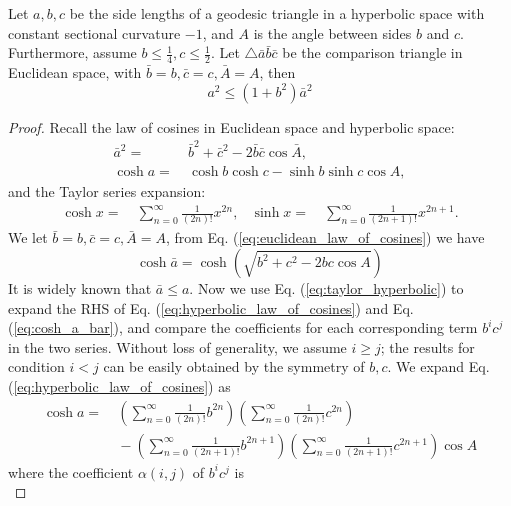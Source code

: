 \begin{lemma} \label{thm:small-c-hyperbolic}
	Let $a,b,c$ be the side lengths of a geodesic triangle in a hyperbolic space with constant sectional curvature $-1$, and $A$ is the angle between sides $b$ and $c$. Furthermore, assume $b\le\frac{1}{4},c\le\frac{1}{2}$. Let $\triangle\bar{a}\bar{b}\bar{c}$ be the comparison triangle in Euclidean space, with $\bar{b}=b,\bar{c}=c,\bar{A}=A$, then
	\begin{equation}
	a^2\le (1+b^2)\bar{a}^2
	\end{equation}
\end{lemma}
\begin{proof}
	Recall the law of cosines in Euclidean space and hyperbolic space:
	\begin{align}
	\label{eq:euclidean_law_of_cosines} \bar{a}^2 = &~ \bar{b}^2 + \bar{c}^2 - 2\bar{b}\bar{c}\cos\bar{A}, \\
	\label{eq:hyperbolic_law_of_cosines} \cosh a = &~ \cosh b \cosh c - \sinh b \sinh c \cos A,
	\end{align}
	and the Taylor series expansion:
	\begin{align} 
		\label{eq:taylor_hyperbolic}
		\cosh x = &~ \sum_{n=0}^{\infty} \frac{1}{(2n)!}x^{2n},  & \sinh x = &~ \sum_{n=0}^{\infty} \frac{1}{(2n+1)!}x^{2n+1}.
	\end{align}
	We let $\bar{b}=b,\bar{c}=c,\bar{A}=A$, from Eq. (\ref{eq:euclidean_law_of_cosines})  we have
	\begin{equation} \label{eq:cosh_a_bar}
	\cosh\bar{a} =  \cosh\left(\sqrt{b^2 + c^2 - 2bc\cos A}\right)
	\end{equation}
	It is widely known that $\bar{a}\le a$.
	Now we use Eq. (\ref{eq:taylor_hyperbolic}) to expand the RHS of Eq. (\ref{eq:hyperbolic_law_of_cosines}) and Eq. (\ref{eq:cosh_a_bar}), and compare the  coefficients for each corresponding term $b^ic^j$ in the two series. Without loss of generality, we assume $i\ge j$; the results for condition $i<j$ can be easily obtained by the symmetry of $b,c$. We expand Eq. (\ref{eq:hyperbolic_law_of_cosines}) as
	\begin{align*}
	\cosh a = &~\left(\sum_{n=0}^{\infty} \frac{1}{(2n)!}b^{2n}\right)\left(\sum_{n=0}^{\infty} \frac{1}{(2n)!}c^{2n}\right) \\
	&~ - \left(\sum_{n=0}^{\infty} \frac{1}{(2n+1)!}b^{2n+1}\right)\left(\sum_{n=0}^{\infty} \frac{1}{(2n+1)!}c^{2n+1}\right)\cos A 
	\end{align*}
	where the coefficient $\alpha(i,j)$ of $b^ic^j$ is 
	\begin{equation}

\end{equation}
\end{proof}
